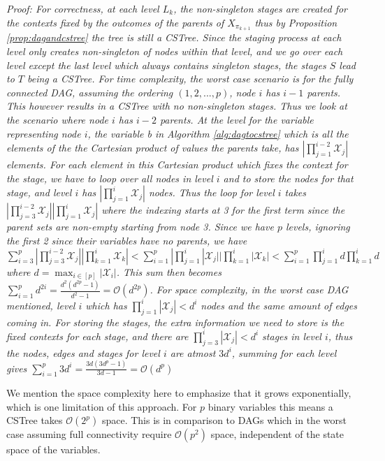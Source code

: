 \documentclass{tufte-book}
\begin{document}
\textit{Proof:
	For correctness, at each level $L_k$, the non-singleton stages are created for the contexts fixed by the outcomes of the parents of $X_{\pi_{k+1}}$ thus by Proposition \ref{prop:dagandcstree} the tree is still a CSTree. Since the staging process at each level only creates non-singleton of nodes within that level, and we go over each level except the last level which always contains singleton stages, the stages $S$ lead to $T$ being a CSTree. For time complexity, the worst case scenario is for the fully connected DAG, assuming the ordering $(1,2,...,p)$, node $i$ has $i-1$ parents. This however results in a CSTree with no non-singleton stages. Thus we look at the scenario where node $i$ has $i-2$ parents. At the level for the variable representing node $i$, the variable b in Algorithm \ref{alg:dagtocstree} which is all the elements of the the Cartesian product of values the parents take, has $|\prod_{j=1}^{i-2} \mathcal{X}_j|$ elements. For each element in this Cartesian product which fixes the context for the stage, we have to loop over all nodes in level $i$ and to store the nodes for that stage, and level $i$ has $|\prod_{j=1}^i \mathcal{X}_j|$ nodes. Thus the loop for level $i$ takes $|\prod_{j=3}^{i-2} \mathcal{X}_j ||\prod_{j=1}^i \mathcal{X}_j| $ where the indexing starts at 3 for the first term since the parent sets are non-empty starting from node 3. Since we have $p$ levels, ignoring the first 2 since their variables have no parents, we have $\sum_{i=3}^p |\prod_{j=3}^{i-2} \mathcal{X}_j ||\prod_{k=1}^i \mathcal{X}_k| < \sum_{i=1}^p |\prod_{j=1}^i |\mathcal{X}_j||\prod_{k=1}^i |\mathcal{X}_k|< \sum_{i=1}^p \prod_{j=1}^i d \prod_{k=1}^i d $ where $d = \max_{i \in [p]} |\mathcal{X}_i|$. This sum then becomes $\sum_{i=1}^p d^{2i}  = \frac{d^2 (d^{2p}-1)}{d^2-1} = \mathcal{O}(d^{2p})$. For space complexity, in the worst case DAG mentioned, level $i$ which has $\prod_{j=1}^i |\mathcal{X}_j| < d^i$ nodes and the same amount of edges coming in. For storing the stages, the extra information we need to store is the fixed contexts for each stage, and  there are $\prod_{j=3}^i |\mathcal{X}_j| < d^i$ stages in level $i$, thus the nodes, edges and stages for level $i$ are atmost $3d^i$, summing for each level gives $\sum_{i=1}^p 3d^i= \frac{3d (3d^{p}-1)}{3d-1} = \mathcal{O}(d^{p})$
}

We mention the space complexity here to emphasize that it grows exponentially, which is one limitation of this approach. For \(p\) binary variables this means a CSTree takes \(\mathcal{O}(2^p)\) space. This is in comparison to DAGs which in the worst case assuming full connectivity require \(\mathcal{O}(p^2)\) space, independent of the state space of the variables. 
\end{document}
